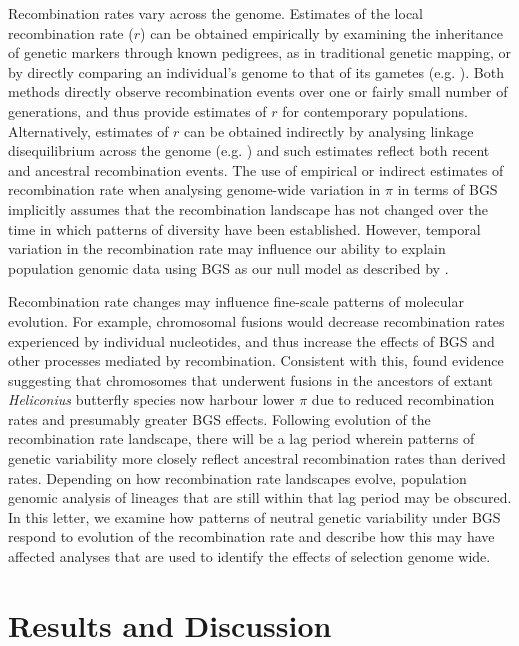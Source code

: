 \documentclass[11pt,twoside, onecolumn]{GSA_format}
\begin{document}
\vspace{5px}
 
Recombination rates vary across the genome. Estimates of the local recombination rate ($r$) can be obtained empirically by examining the inheritance of genetic markers through known pedigrees, as in traditional genetic mapping, or by directly comparing an individual's genome to that of its gametes (e.g. \citealt{Sun2019}). Both methods directly observe recombination events over one or fairly small number of generations, and thus provide estimates of $r$ for contemporary populations. Alternatively, estimates of $r$ can be obtained indirectly by analysing linkage disequilibrium across the genome (e.g. \citealt{Spence2019}) and such estimates reflect both recent and ancestral recombination events. The use of empirical or indirect estimates of recombination rate when analysing genome-wide variation in $\pi$ in terms of BGS implicitly assumes that the recombination landscape has not changed over the time in which patterns of diversity have been established. However, temporal variation in the recombination rate may influence our ability to explain population genomic data using BGS as our null model as described by \cite{Comeron2017-jc}.

\vspace{5px}


Recombination rate changes may influence fine-scale patterns of molecular evolution. For example, chromosomal fusions would decrease recombination rates experienced by individual nucleotides, and thus increase the effects of BGS and other processes mediated by recombination. Consistent with this, \cite{Cicconardi2021}  found evidence suggesting that chromosomes that underwent fusions in the ancestors of extant \textit{Heliconius} butterfly species now harbour lower $\pi$ due to reduced recombination rates and presumably greater BGS effects. Following evolution of the recombination rate landscape, there will be a lag period wherein patterns of genetic variability more closely reflect ancestral recombination rates than derived rates. Depending on how recombination rate landscapes evolve, population genomic analysis of lineages that are still within that lag period may be obscured. In this letter, we examine how patterns of neutral genetic variability under BGS respond to evolution of the recombination rate and describe how this may have affected analyses that are used to identify the effects of selection genome wide. 

\section{Results and Discussion}
\end{document}
